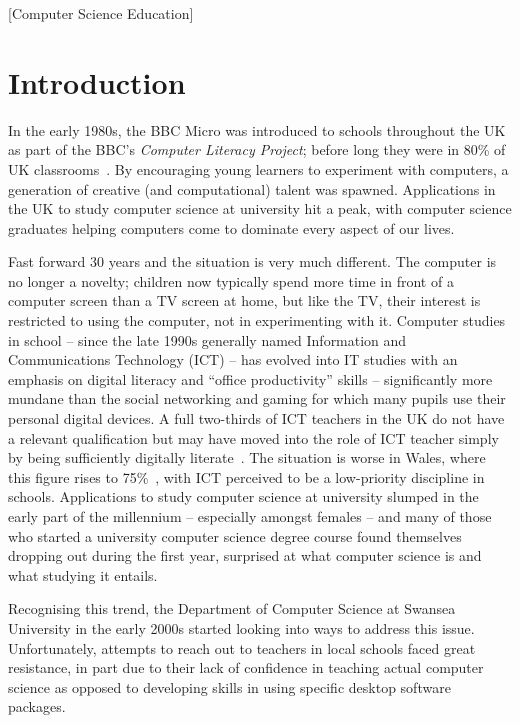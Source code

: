 \documentclass{sig-alternate}
\begin{document}
[Computer Science Education]



\section{Introduction}\label{intro}

In the early 1980s, the BBC Micro was introduced to schools throughout
the UK as part of the BBC's \emph{Computer Literacy Project}; before
long they were in 80\% of UK classrooms~\cite{vasko:1986}. By
encouraging young learners to experiment with computers, a generation
of creative (and computational) talent was spawned. Applications in
the UK to study computer science at university hit a peak, with
computer science graduates helping computers come to dominate every
aspect of our lives.

Fast forward 30 years and the situation is very much different. The
computer is no longer a novelty; children now typically spend more
time in front of a computer screen than a TV screen at home, but like
the TV, their interest is restricted to using the computer, not in
experimenting with it. Computer studies in school -- since the late
1990s generally named Information and Communications Technology (ICT)
-- has evolved into IT studies with an emphasis on digital literacy
and ``office productivity'' skills -- significantly more mundane than
the social networking and gaming for which many pupils use their
personal digital devices. A full two-thirds of ICT teachers in the UK
do not have a relevant qualification but may have moved into the role
of ICT teacher simply by being sufficiently digitally
literate~\cite{RoyalSoc:2012}.  The situation is worse in Wales, where
this figure rises to 75\%~\cite{GTCW:2008}, with ICT perceived to be a
low-priority discipline in schools. Applications to study computer
science at university slumped in the early part of the millennium --
especially amongst females -- and many of those who started a
university computer science degree course found themselves dropping
out during the first year, surprised at what computer science is and
what studying it entails.

Recognising this trend, the Department of Computer Science at Swansea
University in the early 2000s started looking into ways to address
this issue.  Unfortunately, attempts to reach out to teachers in local
schools faced great resistance, in part due to their lack of
confidence in teaching actual computer science as opposed to
developing skills in using specific desktop software packages.
\end{document}
